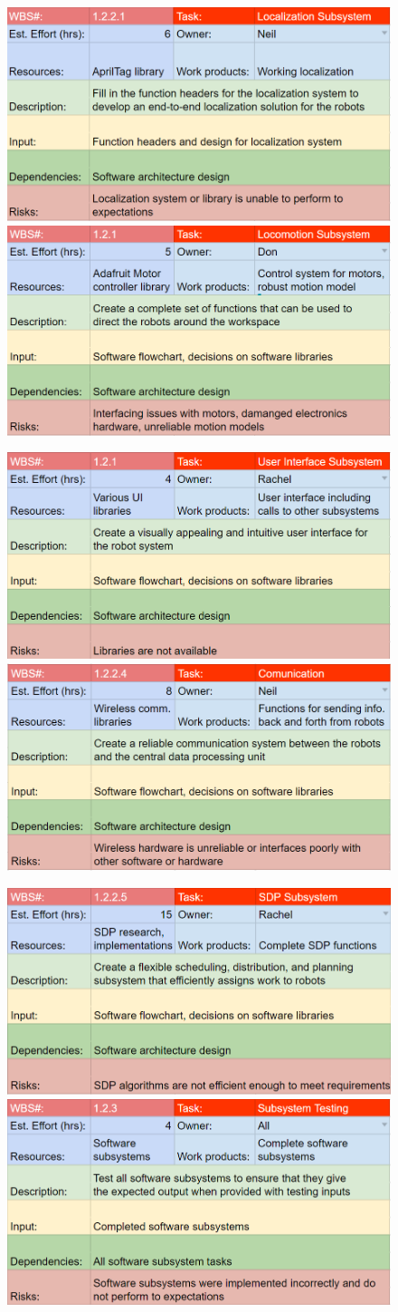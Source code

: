 \begin{figure}[h!]
\centering
\includegraphics[width=0.49\columnwidth]{wbs_schedule/wbs_dict_sw2.PNG}
\includegraphics[width=0.49\columnwidth]{wbs_schedule/wbs_dict_sw3.PNG}
\label{fig:sw2sw3}
\end{figure}
\begin{figure}[h!]
\centering
\includegraphics[width=0.49\columnwidth]{wbs_schedule/wbs_dict_sw4.PNG}
\includegraphics[width=0.49\columnwidth]{wbs_schedule/wbs_dict_sw5.PNG}
\label{fig:sw4sw5}
\end{figure}
\begin{figure}[h!]
\centering
\includegraphics[width=0.49\columnwidth]{wbs_schedule/wbs_dict_sw6.PNG}
\includegraphics[width=0.49\columnwidth]{wbs_schedule/wbs_dict_sw7.PNG}
\label{fig:sw6sw7}
\end{figure}

